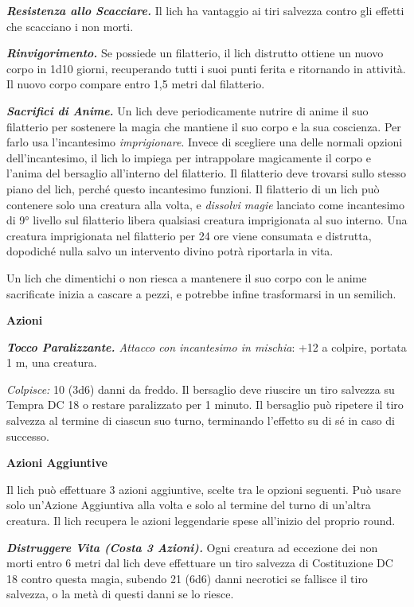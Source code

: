 \begin{multicols}{2}
\emph{\textbf{Resistenza allo Scacciare.}} Il lich ha vantaggio ai tiri
salvezza contro gli effetti che scacciano i non morti.

\emph{\textbf{Rinvigorimento.}} Se possiede un filatterio, il lich
distrutto ottiene un nuovo corpo in 1d10 giorni, recuperando tutti i
suoi punti ferita e ritornando in attività. Il nuovo corpo compare entro
1,5 metri dal filatterio.

\emph{\textbf{Sacrifici di Anime.}} Un lich deve periodicamente nutrire
di anime il suo filatterio per sostenere la magia che mantiene il suo
corpo e la sua coscienza. Per farlo usa l'incantesimo
\emph{imprigionare}. Invece di scegliere una delle normali opzioni
dell'incantesimo, il lich lo impiega per intrappolare magicamente il
corpo e l'anima del bersaglio all'interno del filatterio. Il filatterio
deve trovarsi sullo stesso piano del lich, perché questo incantesimo
funzioni. Il filatterio di un lich può contenere solo una creatura alla
volta, e \emph{dissolvi magie} lanciato come incantesimo di 9° livello
sul filatterio libera qualsiasi creatura imprigionata al suo interno.
Una creatura imprigionata nel filatterio per 24 ore viene consumata e
distrutta, dopodiché nulla salvo un intervento divino potrà riportarla
in vita.

Un lich che dimentichi o non riesca a mantenere il suo corpo con le
anime sacrificate inizia a cascare a pezzi, e potrebbe infine
trasformarsi in un semilich.

\smallskip\textbf{Azioni}

\emph{\textbf{Tocco Paralizzante.} Attacco con incantesimo in mischia}:
+12 a colpire, portata 1 m, una creatura.

\emph{Colpisce:} 10 (3d6) danni da freddo. Il bersaglio deve riuscire un
tiro salvezza su Tempra DC 18 o restare paralizzato per 1 minuto.
Il bersaglio può ripetere il tiro salvezza al termine di ciascun suo
turno, terminando l'effetto su di sé in caso di successo.

\textbf{Azioni Aggiuntive}

Il lich può effettuare 3 azioni aggiuntive, scelte tra le opzioni
seguenti. Può usare solo un'Azione Aggiuntiva alla volta e solo al
termine del turno di un'altra creatura. Il lich recupera le azioni
leggendarie spese all'inizio del proprio round.

\emph{\textbf{Distruggere Vita (Costa 3 Azioni).}} Ogni creatura ad
eccezione dei non morti entro 6 metri dal lich deve effettuare un tiro
salvezza di Costituzione DC 18 contro questa magia, subendo 21 (6d6)
danni necrotici se fallisce il tiro salvezza, o la metà di questi danni
se lo riesce.


\end{multicols}
